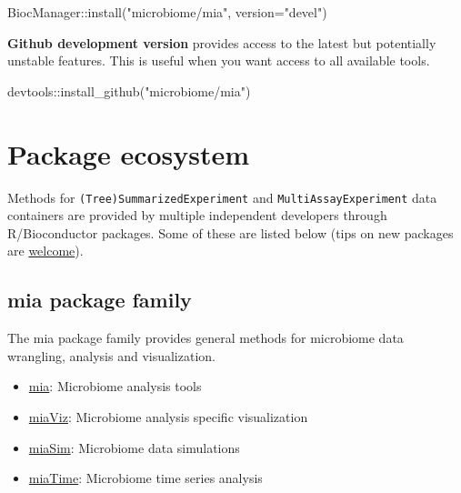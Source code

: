 \documentclass[
]{book}
\newenvironment{Shaded}{\begin{snugshade}}{\end{snugshade}}
\newcommand{\AttributeTok}[1]{\textcolor[rgb]{0.77,0.63,0.00}{#1}}
\newcommand{\FunctionTok}[1]{\textcolor[rgb]{0.00,0.00,0.00}{#1}}
\newcommand{\NormalTok}[1]{#1}
\newcommand{\SpecialCharTok}[1]{\textcolor[rgb]{0.00,0.00,0.00}{#1}}
\newcommand{\StringTok}[1]{\textcolor[rgb]{0.31,0.60,0.02}{#1}}
\providecommand{\tightlist}{%
  \setlength{\itemsep}{0pt}\setlength{\parskip}{0pt}}
\begin{document}
\begin{Shaded}
\begin{Highlighting}[]
\NormalTok{BiocManager}\SpecialCharTok{::}\FunctionTok{install}\NormalTok{(}\StringTok{"microbiome/mia"}\NormalTok{, }\AttributeTok{version=}\StringTok{"devel"}\NormalTok{)}
\end{Highlighting}
\end{Shaded}

\textbf{Github development version} provides access to the latest but
potentially unstable features. This is useful when you want access to
all available tools.

\begin{Shaded}
\begin{Highlighting}[]
\NormalTok{devtools}\SpecialCharTok{::}\FunctionTok{install\_github}\NormalTok{(}\StringTok{"microbiome/mia"}\NormalTok{)}
\end{Highlighting}
\end{Shaded}

\hypertarget{ecosystem}{%
\section{Package ecosystem}\label{ecosystem}}

Methods for \texttt{(Tree)SummarizedExperiment} and \texttt{MultiAssayExperiment}
data containers are provided by multiple independent developers
through R/Bioconductor packages. Some of these are listed below (tips
on new packages are \href{https://microbiome.github.io}{welcome}).

\hypertarget{mia-package-family}{%
\subsection{mia package family}\label{mia-package-family}}

The mia package family provides general methods for microbiome data wrangling, analysis and visualization.

\begin{itemize}
\tightlist
\item
  \href{https://microbiome.github.io/mia/}{mia}: Microbiome analysis tools \citep{R_mia}
\item
  \href{https://microbiome.github.io/miaViz/}{miaViz}: Microbiome analysis specific visualization \citep{Ernst2022}
\item
  \href{https://microbiome.github.io/miaSim/}{miaSim}: Microbiome data simulations \citep{Simsek2021}
\item
  \href{https://microbiome.github.io/miaTime/}{miaTime}: Microbiome time series analysis \citep{Lahti2021}
\end{itemize}
\end{document}
